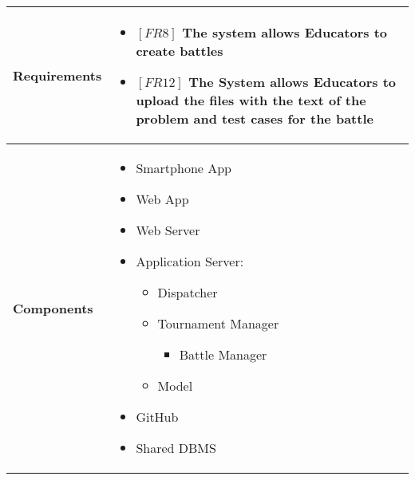 \documentclass{article}
\begin{document}
\begin{table}[H]
 \renewcommand{\arraystretch}{1.5}
    \centering
    \begin{tabular}{|l|p{10cm}|}
        \hline
        \textbf{Requirements} &
        \vspace{-0.6cm}
        \begin{itemize}[label={}, left=0pt, align=left, itemsep=5pt]
            \item $[FR8]$ The system allows Educators to create battles
            \item $[FR12]$ The System allows Educators to upload the files with the text of the problem and test cases for the battle
        \end{itemize} \\
        \hline
        \textbf{Components} & 
        \begin{itemize}[align=left, topsep=0pt, partopsep=0pt]
            \item Smartphone App
            \item Web App
            \item Web Server
            \item Application Server:
            \begin{itemize}
                \item Dispatcher
                \item Tournament Manager
                \begin{itemize}
                    \item Battle Manager
                \end{itemize}
                \item Model
            \end{itemize}
            \item GitHub
            \item Shared DBMS 
        \end{itemize} \\
        \hline
    \end{tabular}
\end{table}
\end{document}
